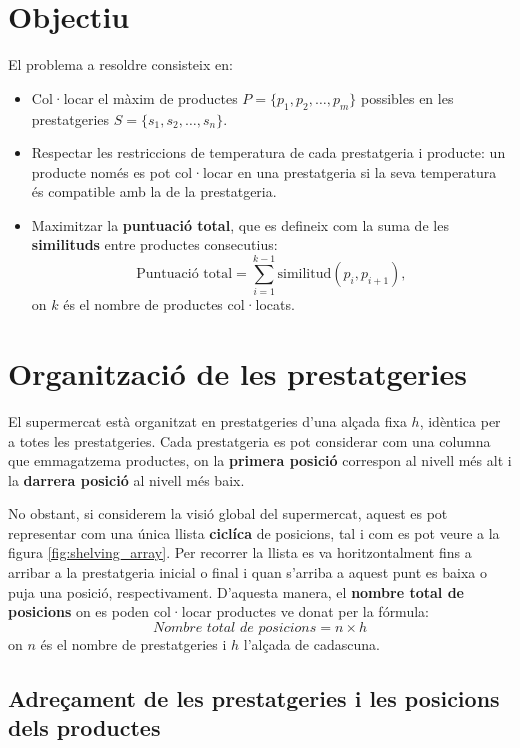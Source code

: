 \documentclass[a4paper,12pt]{report}
\begin{document}
\begin{itemize}
\section{Objectiu}
El problema a resoldre consisteix en:
\begin{itemize}
	\item Col·locar el màxim de productes \(P = \{p_1, p_2, \dots, p_m\}\) possibles en les prestatgeries \(S = \{s_1, s_2, \dots, s_n\}\).
	\item Respectar les restriccions de temperatura de cada prestatgeria i producte: un producte només es pot col·locar en una prestatgeria si la seva temperatura és compatible amb la de la prestatgeria.
	\item Maximitzar la \textbf{puntuació total}, que es defineix com la suma de les \textbf{similituds} entre productes consecutius:
	      \[
		      \text{Puntuació total} = \sum_{i=1}^{k-1} \text{similitud}(p_i, p_{i+1}),
	      \]
	      on \(k\) és el nombre de productes col·locats.
\end{itemize}

\section{Organització de les prestatgeries}

El supermercat està organitzat en prestatgeries d'una alçada fixa \( h \), idèntica per a totes les prestatgeries. Cada prestatgeria es pot considerar com una columna que emmagatzema productes, on la \textbf{primera posició} correspon al nivell més alt i la \textbf{darrera posició} al nivell més baix.

No obstant, si considerem la visió global del supermercat, aquest es pot representar com una única llista \textbf{ciclíca} de posicions, tal i com es pot veure a la figura \ref{fig:shelving_array}. Per recorrer la llista es va horitzontalment fins a arribar a la prestatgeria inicial o final i quan s'arriba a aquest punt es baixa o puja una posició, respectivament.
D'aquesta manera, el \textbf{nombre total de posicions} on es poden col·locar productes ve donat per la fórmula:
\[
	\textit{Nombre total de posicions} = n \times h
\]
on \( n \) és el nombre de prestatgeries i \( h \) l'alçada de cadascuna.

\subsection{Adreçament de les prestatgeries i les posicions dels productes}


\end{itemize}
\end{document}
